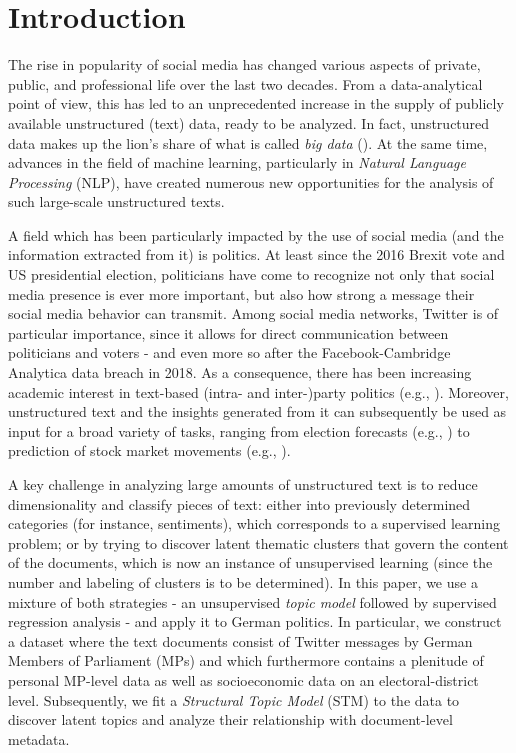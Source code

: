 \section{Introduction}
\label{Introduction}

The rise in popularity of social media has changed various aspects of private, public, and professional life over the last two decades. From a data-analytical point of view, this has led to an unprecedented increase in the supply of publicly available unstructured (text) data, ready to be analyzed. In fact, unstructured data makes up the lion's share of what is called \textit{big data} (\citealp{gandomi2015beyond}). At the same time, advances in the field of machine learning, particularly in \textit{Natural Language Processing} (NLP), have created numerous new opportunities for the analysis of such large-scale unstructured texts.

A field which has been particularly impacted by the use of social media (and the information extracted from it) is politics. At least since the 2016 Brexit vote and US presidential election, politicians have come to recognize not only that social media presence is ever more important, but also how strong a message their social media behavior can transmit. Among social media networks, Twitter is of particular importance, since it allows for direct communication between politicians and voters - and even more so after the Facebook-Cambridge Analytica data breach in 2018. As a consequence, there has been increasing academic interest in text-based (intra- and inter-)party politics (e.g., \citealp{ceron2017intra, daniel2019static, grimmer2010bayesian, quinlan2018show}). Moreover, unstructured text and the insights generated from it can subsequently be used as input for a broad variety of tasks, ranging from election forecasts (e.g., \citealp{burnap2016140, jungherr2016twitter, tumasjan2010predicting}) to prediction of stock market movements (e.g., \citealp{nisar2018twitter}).

A key challenge in analyzing large amounts of unstructured text is to reduce dimensionality and classify pieces of text: either into previously determined categories (for instance, sentiments), which corresponds to a supervised learning problem; or by trying to discover latent thematic clusters that govern the content of the documents, which is now an instance of unsupervised learning (since the number and labeling of clusters is to be determined). In this paper, we use a mixture of both strategies - an unsupervised \textit{topic model} followed by supervised regression analysis - and apply it to German politics. In particular, we construct a dataset where the text documents consist of Twitter messages by German Members of Parliament (MPs) and which furthermore contains a plenitude of personal MP-level data as well as socioeconomic data on an electoral-district level. Subsequently, we fit a \textit{Structural Topic Model} (STM) to the data to discover latent topics and analyze their relationship with document-level metadata.

